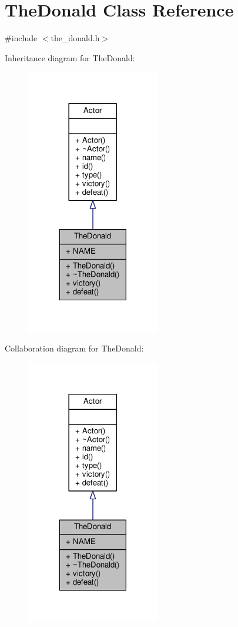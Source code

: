 \hypertarget{classTheDonald}{}\section{The\+Donald Class Reference}
\label{classTheDonald}


{\ttfamily \#include $<$the\+\_\+donald.\+h$>$}



Inheritance diagram for The\+Donald\+:
\nopagebreak
\begin{figure}[H]
\begin{center}
\leavevmode
\includegraphics[width=165pt]{classTheDonald__inherit__graph}
\end{center}
\end{figure}


Collaboration diagram for The\+Donald\+:
\nopagebreak
\begin{figure}[H]
\begin{center}
\leavevmode
\includegraphics[width=165pt]{classTheDonald__coll__graph}
\end{center}
\end{figure}
